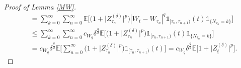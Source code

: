 \documentclass[11pt,a4paper]{article}
\numberwithin{equation}{section}
\theoremstyle{definition}
\newcommand{\E}{{\mathbb{E}}}
\begin{document}
\begin{proof}[Proof of Lemma \ref{MW}]
\begin{equation}
\begin{aligned}
    &= \sum_{k=0}^\infty \sum_{n=0}^{\infty} \E\Big[ \big(1+ \big|Z^{(\delta)}_{\tau_n}\big|^p\big)   |W_t-W_{\tau_n}|^q \mathds{1}_{[\tau_n,\tau_{n+1})}(t) \mathds{1}_{\{N_{\tau_n}=k\}} \Big]\\
    &\leq \sum_{k=0}^\infty \sum_{n=0}^{\infty} c_{W_q} \delta^\frac{q}{2} \E\Big[\big(1+ \big|Z^{(\delta)}_{\tau_n}\big|^p\big) \mathds{1}_{[\tau_n,\tau_{n+1})}(t)  \mathds{1}_{\{N_{\tau_n} = k\}} \Big]\\
    &= c_{W_q} \delta^\frac{q}{2} \E\Big[\sum_{n=0}^{\infty} \big(1+ \big|Z^{(\delta)}_{\tau_n}\big|^p\big) \mathds{1}_{[\tau_n,\tau_{n+1})}(t) \Big]
    = c_{W_q} \delta^\frac{q}{2} \E\Big[1+ \big|Z^{(\delta)}_{\underline t}\big|^p \Big].
    \end{aligned}
\end{equation}
\end{proof}
\end{document}
